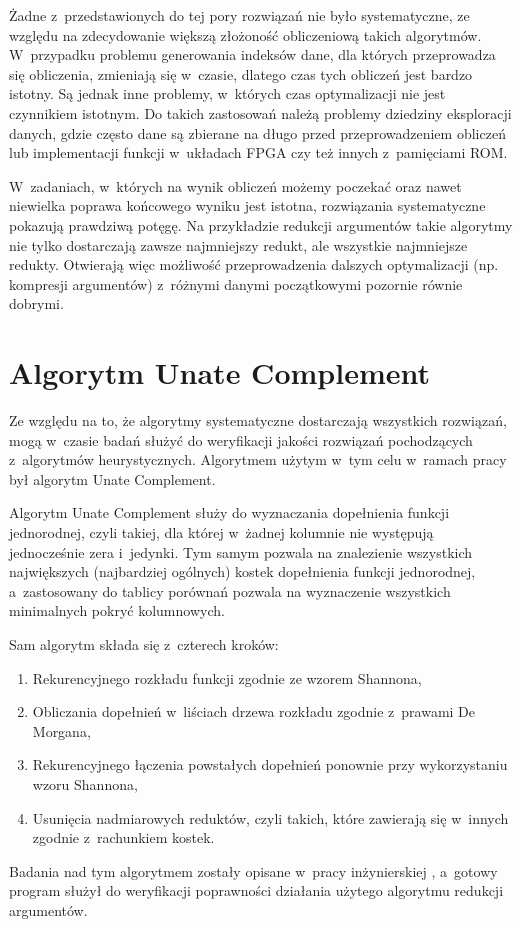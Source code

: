 Żadne z~przedstawionych do tej pory rozwiązań nie było systematyczne,
ze względu na zdecydowanie większą złożoność obliczeniową takich algorytmów.
W~przypadku problemu generowania indeksów dane,
dla których przeprowadza się obliczenia,
zmieniają się w~czasie,
dlatego czas tych obliczeń jest bardzo istotny.
Są jednak inne problemy,
w~których czas optymalizacji nie jest czynnikiem istotnym.
Do takich zastosowań należą problemy dziedziny eksploracji danych,
gdzie często dane są zbierane na długo przed przeprowadzeniem obliczeń
lub implementacji funkcji w~układach FPGA czy też innych z~pamięciami ROM.

W~zadaniach, w~których na wynik obliczeń możemy poczekać oraz nawet niewielka poprawa końcowego wyniku jest istotna,
rozwiązania systematyczne pokazują prawdziwą potęgę.
Na przykładzie redukcji argumentów takie algorytmy nie tylko dostarczają zawsze najmniejszy redukt,
ale wszystkie najmniejsze redukty.
Otwierają więc możliwość przeprowadzenia dalszych optymalizacji (np. kompresji argumentów) z~różnymi danymi początkowymi pozornie równie dobrymi.

\section{Algorytm Unate Complement}

Ze względu na to,
że algorytmy systematyczne dostarczają wszystkich rozwiązań,
mogą w~czasie badań służyć do weryfikacji jakości rozwiązań pochodzących z~algorytmów heurystycznych.
Algorytmem użytym w~tym celu w~ramach pracy był algorytm Unate Complement.

Algorytm Unate Complement służy do wyznaczania dopełnienia funkcji jednorodnej,
czyli takiej,
dla której w~żadnej kolumnie nie występują jednocześnie zera i~jedynki.
Tym samym pozwala na znalezienie wszystkich największych (najbardziej ogólnych) kostek dopełnienia funkcji jednorodnej,
a~zastosowany do tablicy porównań pozwala na wyznaczenie wszystkich minimalnych pokryć kolumnowych.

Sam algorytm składa się z~czterech kroków:
\begin{enumerate}
\item Rekurencyjnego rozkładu funkcji zgodnie ze wzorem Shannona,
\item Obliczania dopełnień w~liściach drzewa rozkładu zgodnie z~prawami De Morgana,
\item Rekurencyjnego łączenia powstałych dopełnień ponownie przy wykorzystaniu wzoru Shannona,
\item Usunięcia nadmiarowych reduktów,
czyli takich,
które zawierają się w~innych zgodnie z~rachunkiem kostek.
\end{enumerate}
Badania nad tym algorytmem zostały opisane w~pracy inżynierskiej \cite{inzynierka},
a~gotowy program służył do weryfikacji poprawności działania użytego algorytmu redukcji argumentów.
